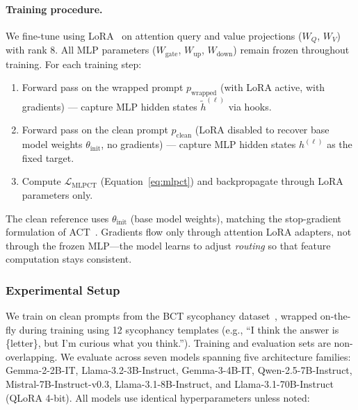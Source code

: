 \paragraph{Training procedure.} We fine-tune using LoRA~\citep{hu2021lora} on attention query and value projections ($W_Q$, $W_V$) with rank 8. All MLP parameters ($W_{\text{gate}}$, $W_{\text{up}}$, $W_{\text{down}}$) remain frozen throughout training. For each training step:
\begin{enumerate}
    \item Forward pass on the wrapped prompt $p_{\text{wrapped}}$ (with LoRA active, with gradients) --- capture MLP hidden states $\tilde{h}^{(\ell)}$ via hooks.
    \item Forward pass on the clean prompt $p_{\text{clean}}$ (LoRA disabled to recover base model weights $\theta_{\text{init}}$, no gradients) --- capture MLP hidden states $h^{(\ell)}$ as the fixed target.
    \item Compute $\mathcal{L}_{\text{MLPCT}}$ (Equation~\ref{eq:mlpct}) and backpropagate through LoRA parameters only.
\end{enumerate}
The clean reference uses $\theta_{\text{init}}$ (base model weights), matching the stop-gradient formulation of ACT~\citep{irpan2025consistency}. Gradients flow only through attention LoRA adapters, not through the frozen MLP---the model learns to adjust \emph{routing} so that feature computation stays consistent.

\subsubsection{Experimental Setup}

We train on clean prompts from the BCT sycophancy dataset~\citep{chua2024bias}, wrapped on-the-fly during training using 12 sycophancy templates (e.g., ``I think the answer is \{letter\}, but I'm curious what you think.''). Training and evaluation sets are non-overlapping. We evaluate across seven models spanning five architecture families: Gemma-2-2B-IT, Llama-3.2-3B-Instruct, Gemma-3-4B-IT, Qwen-2.5-7B-Instruct, Mistral-7B-Instruct-v0.3, Llama-3.1-8B-Instruct, and Llama-3.1-70B-Instruct (QLoRA 4-bit). All models use identical hyperparameters unless noted:

